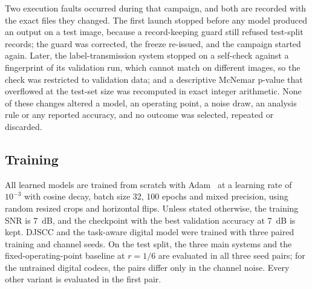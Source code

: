 \documentclass[conference]{IEEEtran}
\begin{document}
Two execution faults occurred during that campaign, and both are recorded with the exact files they changed. The first launch stopped before any model produced an output on a test image, because a record-keeping guard still refused test-split records; the guard was corrected, the freeze re-issued, and the campaign started again. Later, the label-transmission system stopped on a self-check against a fingerprint of its validation run, which cannot match on different images, so the check was restricted to validation data; and a descriptive McNemar p-value that overflowed at the test-set size was recomputed in exact integer arithmetic. None of these changes altered a model, an operating point, a noise draw, an analysis rule or any reported accuracy, and no outcome was selected, repeated or discarded.

\subsection{Training}
All learned models are trained from scratch with Adam~\cite{kingma2015adam} at a learning rate of $10^{-3}$ with cosine decay, batch size 32, 100 epochs and mixed precision, using random resized crops and horizontal flips. Unless stated otherwise, the training SNR is 7~dB, and the checkpoint with the best validation accuracy at 7~dB is kept. DJSCC and the task-aware digital model were trained with three paired training and channel seeds. On the test split, the three main systems and the fixed-operating-point baseline at $r=1/6$ are evaluated in all three seed pairs; for the untrained digital codecs, the pairs differ only in the channel noise. Every other variant is evaluated in the first pair.
\end{document}
